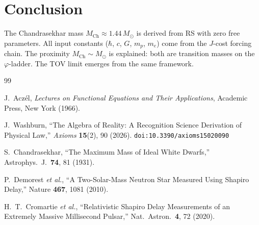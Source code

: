 \documentclass[12pt,a4paper]{article}
\theoremstyle{definition}
\theoremstyle{remark}
\begin{document}
\section{Conclusion}
\label{sec:conclusion}

The Chandrasekhar mass $M_{\mathrm{Ch}} \approx 1.44\,M_\odot$ is
derived from RS with zero free parameters.  All input constants
($\hbar$, $c$, $G$, $m_p$, $m_e$) come from the $J$-cost forcing
chain.  The proximity $M_{\mathrm{Ch}} \sim M_\odot$ is explained:
both are transition masses on the $\varphi$-ladder.  The TOV limit
emerges from the same framework.

\begin{thebibliography}{99}

J.~Acz\'el, \emph{Lectures on Functional Equations and Their Applications},
Academic Press, New York (1966).

J.~Washburn, ``The Algebra of Reality: A Recognition Science Derivation
of Physical Law,'' \emph{Axioms} \textbf{15}(2), 90 (2026).
\texttt{doi:10.3390/axioms15020090}

S.~Chandrasekhar, ``The Maximum Mass of Ideal White Dwarfs,''
Astrophys.\ J.\ \textbf{74}, 81 (1931).

P.~Demorest \emph{et al.}, ``A Two-Solar-Mass Neutron Star
Measured Using Shapiro Delay,'' Nature \textbf{467}, 1081 (2010).

H.~T.~Cromartie \emph{et al.}, ``Relativistic Shapiro Delay
Measurements of an Extremely Massive Millisecond Pulsar,'' Nat.\
Astron.\ \textbf{4}, 72 (2020).

\end{thebibliography}
\end{document}
